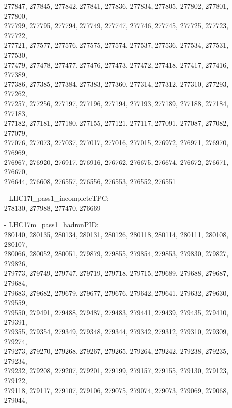 \begin{appendix}
\begin{itemize}
     277847, 277845, 277842, 277841, 277836, 277834, 277805, 277802, 277801, 277800,\\
     277799, 277795, 277794, 277749, 277747, 277746, 277745, 277725, 277723, 277722,\\
     277721, 277577, 277576, 277575, 277574, 277537, 277536, 277534, 277531, 277530,\\
     277479, 277478, 277477, 277476, 277473, 277472, 277418, 277417, 277416, 277389,\\
     277386, 277385, 277384, 277383, 277360, 277314, 277312, 277310, 277293, 277262,\\
     277257, 277256, 277197, 277196, 277194, 277193, 277189, 277188, 277184, 277183,\\
     277182, 277181, 277180, 277155, 277121, 277117, 277091, 277087, 277082, 277079,\\
     277076, 277073, 277037, 277017, 277016, 277015, 276972, 276971, 276970, 276969,\\
     276967, 276920, 276917, 276916, 276762, 276675, 276674, 276672, 276671, 276670,\\
     276644, 276608, 276557, 276556, 276553, 276552, 276551
    \item[-] LHC17l\_pass1\_incompleteTPC:\\[1pt]
     278130, 277988, 277470, 276669 
    \item[-] LHC17m\_pass1\_hadronPID:\\[1pt]
     280140, 280135, 280134, 280131, 280126, 280118, 280114, 280111, 280108, 280107,\\
     280066, 280052, 280051, 279879, 279855, 279854, 279853, 279830, 279827, 279826,\\
     279773, 279749, 279747, 279719, 279718, 279715, 279689, 279688, 279687, 279684,\\
     279683, 279682, 279679, 279677, 279676, 279642, 279641, 279632, 279630, 279559,\\
     279550, 279491, 279488, 279487, 279483, 279441, 279439, 279435, 279410, 279391,\\
     279355, 279354, 279349, 279348, 279344, 279342, 279312, 279310, 279309, 279274,\\
     279273, 279270, 279268, 279267, 279265, 279264, 279242, 279238, 279235, 279234,\\
     279232, 279208, 279207, 279201, 279199, 279157, 279155, 279130, 279123, 279122,\\
     279118, 279117, 279107, 279106, 279075, 279074, 279073, 279069, 279068, 279044,\\

\end{itemize}
\end{appendix}
